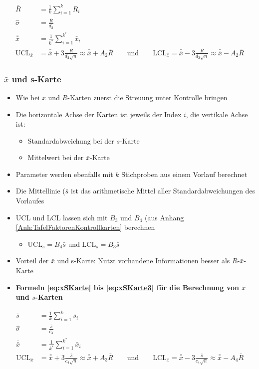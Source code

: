 \begin{align}
	\label{eq:xRKarte}
	\bar{R} &= \frac{1}{k}\sum_{i=1}^{k}R_i\\
	\label{eq:xRKarte4}
	\hat{\sigma} &= \frac{\bar{R}}{d_2}\\
	\label{eq:xRKarte2}
	\bar{\bar{x}} &= \frac{1}{k^\ast}\sum_{i=1}^{k^\ast}\bar{x}_i\\
	\label{eq:xRKarte3}
	\text{UCL}_{\bar{x}}  &= \bar{\bar{x}} + 3\frac{\bar{R}}{d_2\sqrt{n}} \approx \bar{\bar{x}}+A_2\bar{R} \qquad \text{und} \qquad \text{LCL}_{\bar{x}} = \bar{\bar{x}} - 3\frac{\bar{R}}{d_2\sqrt{n}} \approx \bar{\bar{x}}-A_2\bar{R}
\end{align}

\subsubsection{$\bar{x}$ und s-Karte}
\begin{itemize}
	\item Wie bei $\bar{x}$ und $R$-Karten zuerst die Streuung unter Kontrolle bringen
	\item Die horizontale Achse der Karten ist jeweils der Index $i$, die vertikale Achse ist: 
	\begin{itemize}
		\item Standardabweichung bei der $s$-Karte
		\item Mittelwert bei der $\bar{x}$-Karte
	\end{itemize}
	\item Parameter werden ebenfalls mit $k$ Stichproben aus einem Vorlauf berechnet
	\item Die Mittellinie ($\bar{s}$ ist das arithmetische Mittel aller Standardabweichungen des Vorlaufes
	\item UCL und LCL lassen sich mit $B_3$ und $B_4$ (aus Anhang \ref{Anh:TafelFaktorenKontrollkarten} berechnen
	\begin{itemize}
		\item $\text{UCL}_s = B_4\bar{s}$ und $\text{LCL}_s = B_3\bar{s}$
	\end{itemize}
	\item Vorteil der $\bar{x}$ und s-Karte: Nutzt vorhandene Informationen besser als $R$-$\bar{x}$-Karte
	\item \textbf{Formeln \ref{eq:xSKarte} bis \ref{eq:xSKarte3} für die Berechnung von $\bar{x}$ und $s$-Karten}
\end{itemize}
\begin{align}
	\label{eq:xSKarte}
	\bar{s} &= \frac{1}{k}\sum_{i=1}^{k}s_i\\
	\label{eq:xSKarte4}
	\hat{\sigma} &= \frac{\bar{s}}{c_4}\\
	\label{eq:xSKarte2}
	\bar{\bar{x}} &= \frac{1}{k^\ast}\sum_{i=1}^{k^\ast}\bar{x}_i\\
	\label{eq:xSKarte3}
	\text{UCL}_{\bar{x}} &= \bar{\bar{x}} + 3\frac{\bar{s}}{c_4\sqrt{n}} \approx \bar{\bar{x}}+A_3\bar{R} \qquad \text{und} \qquad \text{LCL}_{\bar{x}} = \bar{\bar{x}} - 3\frac{\bar{s}}{c_4\sqrt{n}} \approx \bar{\bar{x}}-A_4\bar{R}	
\end{align}

